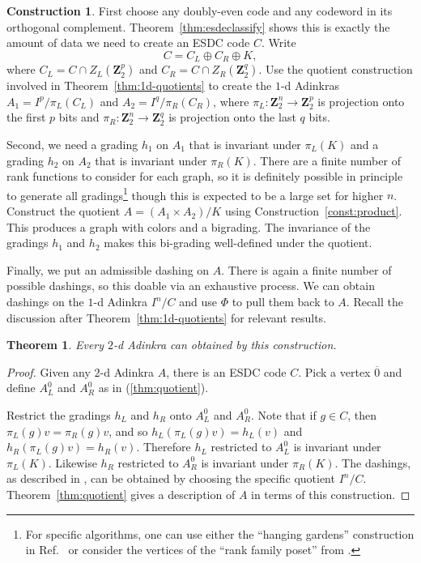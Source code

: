 \documentclass[12pt,twoside,singlespace]{article}
\numberwithin{equation}{section}
\newtheorem{thm}[equation]{Theorem}
\theoremstyle{definition}
\newtheorem{construction}[equation]{Construction}
\newcommand{\ZZ}{\mathbf{Z}}
\begin{document}
\begin{construction}
First choose any doubly-even code and any codeword in its orthogonal complement. Theorem~\ref{thm:esdeclassify} shows this is exactly the amount of data we need to create an ESDC code $C$.  Write
\[C=C_L\oplus C_R\oplus K,\]
where $C_L=C\cap Z_L(\ZZ_2^p)$ and $C_R=C\cap Z_R(\ZZ_2^q)$. Use the quotient construction involved in Theorem~\ref{thm:1d-quotients} to create the $1$-d Adinkras $A_1=I^p/\pi_L(C_L)$ and $A_2=I^q/\pi_R(C_R)$, where $\pi_L:\ZZ_2^n\to\ZZ_2^p$ is projection onto the first $p$ bits and $\pi_R:\ZZ_2^n\to\ZZ_2^q$ is projection onto the last $q$ bits.

Second, we need a grading $h_1$ on $A_1$ that is invariant under $\pi_L(K)$ and a grading $h_2$ on $A_2$ that is invariant under $\pi_R(K)$. There are a finite number of rank functions to consider for each graph, so it is definitely possible in principle to generate all gradings\footnote{For specific algorithms, one can use either the ``hanging gardens'' construction in Ref.~\cite{d2l:graph-theoretic} or consider the vertices of the ``rank family poset'' from \cite{zhang:adinkras}.} though this is expected to be a large set for higher $n$. Construct the quotient $A=(A_1\times A_2)/K$ using Construction~\ref{const:product}.  This produces a graph with colors and a bigrading. The invariance of the gradings $h_1$ and $h_2$ makes this bi-grading well-defined under the quotient.

Finally, we put an admissible dashing on $A$. There is again a finite number of possible dashings, so this doable via an exhaustive process. We can obtain dashings on the $1$-d Adinkra $I^n/C$ and use $\Phi$ to pull them back to $A$. Recall the discussion after Theorem~\ref{thm:1d-quotients} for relevant results. 

\end{construction}

\begin{thm}
Every $2$-d Adinkra can obtained by this construction.
\end{thm}

\begin{proof}
Given any $2$-d Adinkra $A$, there is an ESDC code $C$.  Pick a vertex $\overline{0}$ and define $A_L^0$ and $A_R^0$ as in (\ref{thm:quotient}).

Restrict the gradings $h_L$ and $h_R$ onto $A_L^0$ and $A_R^0$.  Note that if $g\in C$, then $\pi_L(g)v=\pi_R(g)v$, and so $h_L(\pi_L(g)v)=h_L(v)$ and $h_R(\pi_L(g)v)=h_R(v)$.  Therefore $h_L$ restricted to $A_L^0$ is invariant under $\pi_L(K)$.  Likewise $h_R$ restricted to $A_R^0$ is invariant under $\pi_R(K)$. The dashings, as described in \cite{d2l:topology}, can be obtained by choosing the specific quotient $I^n/C$. Theorem~\ref{thm:quotient} gives a description of $A$ in terms of this construction.
\end{proof}
\end{document}
